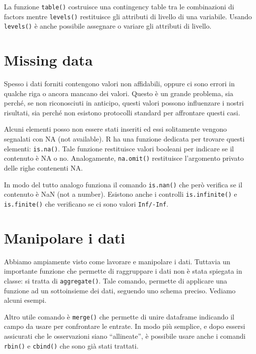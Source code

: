 \documentclass[]{book}
\begin{document}
La funzione \texttt{table()} costruisce una contingency table tra le combinazioni di factors mentre \texttt{levels()} restituisce gli attributi di livello di una variabile. Usando \texttt{levels()} è anche possibile assegnare o variare gli attributi di livello.

\hypertarget{missing-data}{%
\section{Missing data}\label{missing-data}}

Spesso i dati forniti contengono valori non affidabili, oppure ci sono errori in qualche riga o ancora mancano dei valori. Questo è un grande problema, sia perché, se non riconosciuti in anticipo, questi valori possono influenzare i nostri risultati, sia perché non esistono protocolli standard per affrontare questi casi.

Alcuni elementi posso non essere stati inseriti ed essi solitamente vengono segnalati con NA (not available). R ha una funzione dedicata per trovare questi elementi: \texttt{is.na()}. Tale funzione restituisce valori booleani per indicare se il contenuto è NA o no. Analogamente, \texttt{na.omit()} restituisce l'argomento privato delle righe contenenti NA.

In modo del tutto analogo funziona il comando \texttt{is.nan()} che però verifica se il contenuto è NaN (not a number). Esistono anche i controlli \texttt{is.infinite()} e \texttt{is.finite()} che verificano se ci sono valori \texttt{Inf/-Inf}.

\hypertarget{manipolare-i-dati}{%
\section{Manipolare i dati}\label{manipolare-i-dati}}

Abbiamo ampiamente visto come lavorare e manipolare i dati. Tuttavia un importante funzione che permette di raggruppare i dati non è stata spiegata in classe: si tratta di \texttt{aggregate()}. Tale comando, permette di applicare una funzione ad un sottoinsieme dei dati, seguendo uno schema preciso. Vediamo alcuni esempi.

Altro utile comando è \texttt{merge()} che permette di unire dataframe indicando il campo da usare per confrontare le entrate. In modo più semplice, e dopo essersi assicurati che le osservazioni siano ``allineate'', è possibile usare anche i comandi \texttt{rbin()} e \texttt{cbind()} che sono già stati trattati.
\end{document}

